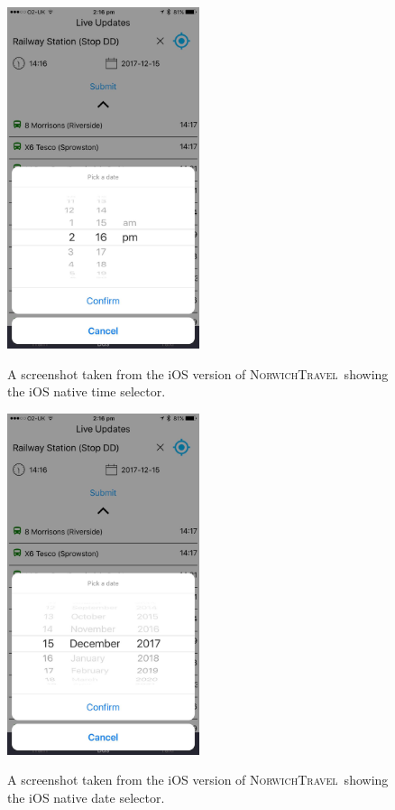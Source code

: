 \documentclass[cmpstyle]{ueacmpstyle}
\newcommand{\nt}{\textsc{NorwichTravel}}
\begin{document}
		\begin{figure}
			\centering
			\includegraphics[height=10cm]{images/ios-time.jpg}\\
			\caption{A screenshot taken from the iOS version of \nt \ showing the iOS native time selector.}\label{fig:ios-time}
		\end{figure}
		\begin{figure}
			\centering
			\includegraphics[height=10cm]{images/ios-date.jpg}\\
			\caption{A screenshot taken from the iOS version of \nt \ showing the iOS native date selector.}\label{fig:ios-date}
		\end{figure}
\end{document}
